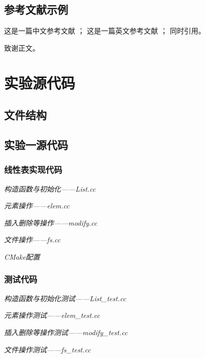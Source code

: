 \documentclass[format=draft,language=chinese,category=academic-report]{hustreport}
\begin{document}
\section{参考文献示例}
这是一篇中文参考文献\cite{TEXGURU99} ； 这是一篇英文参考文献\cite{knuth} ； 同时引用\cite{TEXGURU99,knuth}。

\backmatter

\begin{ack}
致谢正文。
\end{ack}



\appendix

\chapter{实验源代码}\label{appendix:1}
\section{文件结构}

\section{实验一源代码}\label{appendix:lab1}
\subsection{线性表实现代码}
\emph{构造函数与初始化——List.cc}

\emph{元素操作——elem.cc}

\emph{插入删除等操作——modify.cc}

\emph{文件操作——fs.cc}

\emph{CMake配置}

\subsection{测试代码}\label{appendix:test1}
\emph{构造函数与初始化测试——List\_test.cc}

\emph{元素操作测试——elem\_test.cc}

\emph{插入删除等操作测试——modify\_test.cc}

\emph{文件操作测试——fs\_test.cc}

\end{document}
